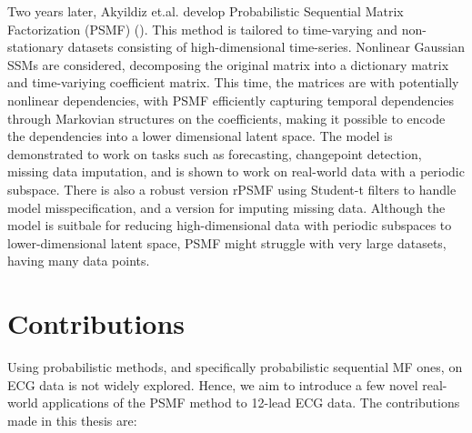 \documentclass{mldsmsc}
\begin{document}
\noindent Two years later, Akyildiz et.al. develop Probabilistic Sequential Matrix Factorization (PSMF) (\cite{akyildiz2021probabilistic}). This method is tailored to time-varying and non-stationary datasets consisting of high-dimensional time-series. Nonlinear Gaussian SSMs are considered, decomposing the original matrix into a dictionary matrix and time-variying coefficient matrix. This time, the matrices are with potentially nonlinear dependencies, with PSMF efficiently capturing temporal dependencies through Markovian structures on the coefficients, making it possible to encode the dependencies into a lower dimensional latent space. The model is demonstrated to work on tasks such as forecasting, changepoint detection, missing data imputation, and is shown to work on real-world data with a periodic subspace. There is also a robust version rPSMF using Student-t filters to handle model misspecification, and a version for imputing missing data. Although the model is suitbale for reducing high-dimensional data with periodic subspaces to lower-dimensional latent space, PSMF might struggle with very large datasets, having many data points. \newline


\section{Contributions}

Using probabilistic methods, and specifically probabilistic sequential MF ones, on ECG data is not widely explored. Hence, we aim to introduce a few novel real-world applications of the PSMF method to 12-lead ECG data. The contributions made in this thesis are:
\end{document}
